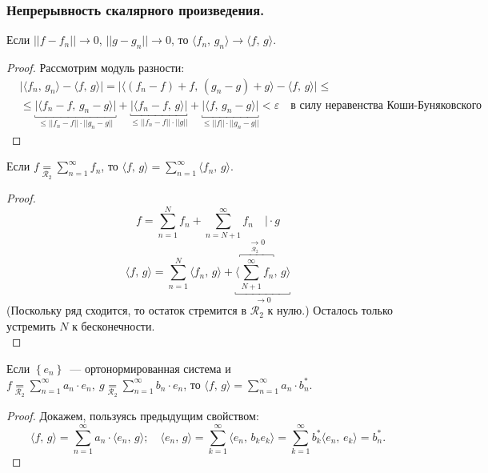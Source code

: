 \subsubsection{Непрерывность скалярного произведения.}
\begin{theorem*}
    Если $\lvert \lvert f - f_n \rvert \rvert \to 0$, $\lvert \lvert g - g_n \rvert \rvert \to 0$, то $\langle f_n,\, g_n \rangle \to \langle f,\, g \rangle$.
\end{theorem*}
\begin{proof}
    Рассмотрим модуль разности:
    \begin{align*}
&\lvert\langle f_n,\, g_n \rangle - \langle f,\, g \rangle \rvert = \lvert \langle (f_n - f) + f,\, (g_n - g) + g \rangle - \langle f,\, g \rangle \rvert \leq \\
& \leq  \underbracket{\lvert \langle f_n - f,\, g_n - g \rangle \rvert}_{\leq \lvert \lvert f_n - f \rvert \rvert \cdot \lvert \lvert g_n - g \rvert \rvert} + \underbracket{\lvert \langle f_n - f,\, g \rangle \rvert}_{\leq \lvert \lvert f_n - f \rvert \rvert \cdot \lvert \lvert g \rvert \rvert} + \underbracket{\lvert \langle f,\, g_n - g \rangle \rvert}_{\leq \lvert \lvert f \rvert \rvert \cdot \lvert \lvert g_n - g \rvert \rvert} < \varepsilon \quad \text{в силу неравенства Коши-Буняковского}
    \end{align*}
\end{proof}

\begin{corollary}[1]
    Если $f \underset{\mathcal{R}_2}{=} \sum_{n=1}^{\infty} f_n$, то $\langle f,\, g \rangle = \sum_{n=1}^\infty \langle f_n,\, g \rangle$.
\end{corollary}
\begin{proof}
    \[f = \sum_{n=1}^N f_n + \sum_{n = N+1}^{\infty} f_n \quad \Big| \cdot g\]
    \[\langle f,\, g \rangle = \sum_{n=1}^N \langle f_n ,\, g \rangle + \underbracket{\langle\overbracket{\sum_{N+1}^{\infty} f_n}^{\xrightarrow[\mathcal{R}_2]{} 0},\, g \rangle}_{\to 0}\]
    (Поскольку ряд сходится, то остаток стремится в $\mathcal{R}_2$ к нулю.) Осталось только устремить $N$ к бесконечности.\\
\end{proof}

\begin{corollary}[2]
    Если $\left\{ e_n \right\}$~--- ортонормированная система и $f \underset{\mathcal{R}_2}{=} \sum_{n = 1}^\infty a_n \cdot e_n,\ g \underset{\mathcal{R}_2}{=} \sum_{n=1}^{\infty} b_n \cdot e_n$, то $\langle f,\, g \rangle = \sum_{n=1}^\infty a_n \cdot b_n^*$.
\end{corollary}
\begin{proof}
    Докажем, пользуясь предыдущим свойством:
    \[\langle f,\, g \rangle = \sum_{n=1}^{\infty} a_n \cdot \langle e_n,\, g \rangle; \quad \langle e_n,\, g \rangle = \sum_{k=1}^\infty \langle e_n,\, b_k e_k \rangle = \sum_{k=1}^\infty b_k^* \langle e_n ,\, e_k \rangle = b_n^*.\]        
\end{proof}
